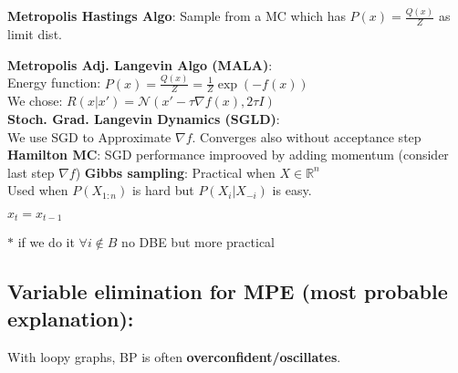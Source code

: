 \textbf{Metropolis Hastings Algo}: Sample from a MC which has $P(x) = \frac{Q(x)}{Z}$ as limit dist.\\
\begin{algorithm}[H]
 \end{algorithm}
\textbf{Metropolis Adj. Langevin Algo (MALA)}:\\
Energy function: $P(x)=\frac{Q(x)}{Z}=\frac{1}{Z}\exp{(-f(x))}$\\
We chose: $R(x\vert x') = \mathcal{N}(x' - \tau \nabla f(x), 2\tau I)$\\
\textbf{Stoch. Grad. Langevin Dynamics (SGLD)}:\\
We use SGD to Approximate $\nabla f$. Converges also without acceptance step \\
\textbf{Hamilton MC}: SGD performance improoved by adding momentum (consider last step $\nabla f$)
\textbf{Gibbs sampling}: Practical when $X\in\mathbb{R}^n$\\
Used when $P(X_{1:n})$ is hard but $P(X_i\vert X_{-i})$ is easy.
\begin{algorithm}[H]
    {
        $x_t = x_{t-1}$\\

    }
\end{algorithm}
$*$ if we do it $\forall i \notin B$ no DBE but more practical


\subsection{Variable elimination for MPE (most probable explanation):}
With loopy graphs, BP is often \textbf{overconfident/oscillates}.

